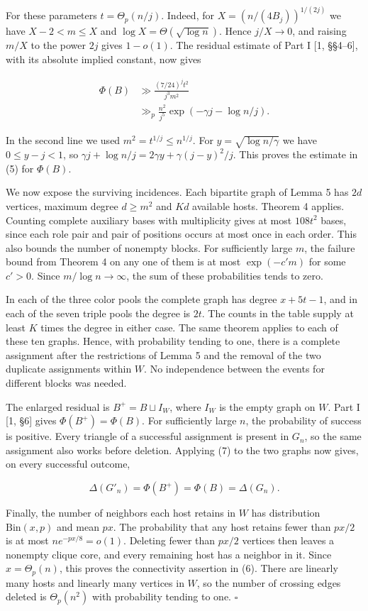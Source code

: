 \documentclass[english,11pt,a4paper]{article}
\newcounter{none}
\begin{document}
For these parameters \(t=\Theta_p(n/j)\). Indeed, for \(X=(n/(4B_j))^{1/(2j)}\) we have \(X-2<m\le X\) and \(\log X=\Theta(\sqrt{\log n})\). Hence \(j/X\to0\), and raising \(m/X\) to the power \(2j\) gives \(1-o(1)\). The residual estimate of Part I {[}1, §§4--6{]}, with its absolute implied constant, now gives

\[\begin{aligned}
\Phi(B)&\gg \frac{(7/24)^j t^2}{j^3m^2}\\
&\gg_p \frac{n^2}{j^5}\exp(-\gamma j-\log n/j).
\end{aligned}
\tag{10}\]

In the second line we used \(m^2=t^{1/j}\le n^{1/j}\). For \(y=\sqrt{\log n/\gamma}\) we have \(0\le y-j<1\), so \(\gamma j+\log n/j=2\gamma y+\gamma(j-y)^2/j\). This proves the estimate in (5) for \(\Phi(B)\).

We now expose the surviving incidences. Each bipartite graph of Lemma 5 has \(2d\) vertices, maximum degree \(d\ge m^2\) and \(Kd\) available hosts. Theorem 4 applies. Counting complete auxiliary bases with multiplicity gives at most \(108t^2\) bases, since each role pair and pair of positions occurs at most once in each order. This also bounds the number of nonempty blocks. For sufficiently large \(m\), the failure bound from Theorem 4 on any one of them is at most \(\exp(-c'm)\) for some \(c'>0\). Since \(m/\log n\to\infty\), the sum of these probabilities tends to zero.

In each of the three color pools the complete graph has degree \(x+5t-1\), and in each of the seven triple pools the degree is \(2t\). The counts in the table supply at least \(K\) times the degree in either case. The same theorem applies to each of these ten graphs. Hence, with probability tending to one, there is a complete assignment after the restrictions of Lemma 5 and the removal of the two duplicate assignments within \(W\). No independence between the events for different blocks was needed.

The enlarged residual is \(B^+=B\sqcup I_W\), where \(I_W\) is the empty graph on \(W\). Part I {[}1, §6{]} gives \(\Phi(B^+)=\Phi(B)\). For sufficiently large \(n\), the probability of success is positive. Every triangle of a successful assignment is present in \(G_n\), so the same assignment also works before deletion. Applying (7) to the two graphs now gives, on every successful outcome,

\[\Delta(G'_n)=\Phi(B^+)=\Phi(B)=\Delta(G_n).\]

Finally, the number of neighbors each host retains in \(W\) has distribution \(\mathrm{Bin}(x,p)\) and mean \(px\). The probability that any host retains fewer than \(px/2\) is at most \(ne^{-px/8}=o(1)\). Deleting fewer than \(px/2\) vertices then leaves a nonempty clique core, and every remaining host has a neighbor in it. Since \(x=\Theta_p(n)\), this proves the connectivity assertion in (6). There are linearly many hosts and linearly many vertices in \(W\), so the number of crossing edges deleted is \(\Theta_p(n^2)\) with probability tending to one. \(\square\)
\end{document}
